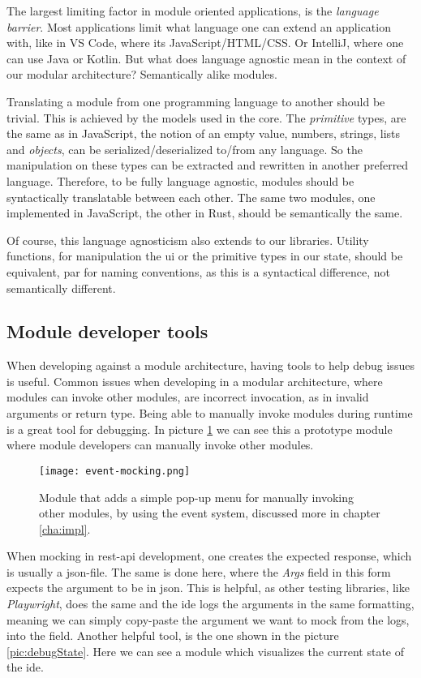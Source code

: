 The largest limiting factor in module oriented applications, is the
\textit{language barrier}. Most applications limit what language one can extend
an application with, like in VS Code, where its JavaScript/HTML/CSS. Or
IntelliJ, where one can use Java or Kotlin. But what does language agnostic
mean in the context of our modular architecture? Semantically alike modules.

Translating a module from one programming language to another should be trivial.
This is achieved by the models used in the core. The \textit{primitive} types,
are the same as in JavaScript, the notion of an empty value, numbers, strings,
lists and \textit{objects}, can be serialized/deserialized to/from any language.
So the manipulation on these types can be extracted and rewritten in another
preferred language. Therefore, to be fully language agnostic, modules should be
syntactically translatable between each other. The same two modules, one
implemented in JavaScript, the other in Rust, should be semantically the same.

Of course, this language agnosticism also extends to our libraries. Utility
functions, for manipulation the \gls*{ui} or the primitive types in our state,
should be equivalent, par for naming conventions, as this is a syntactical
difference, not semantically different.


\subsection{Module developer tools}

When developing against a module architecture, having tools to help debug issues
is useful. Common issues when developing in a modular architecture, where
modules can invoke other modules, are incorrect invocation, as in invalid
arguments or return type. Being able to manually invoke modules during runtime
is a great tool for debugging. In picture \ref{pic:eventMock} we can see this a
prototype module where module developers can manually invoke other modules.

\begin{figure}[H]
  \centering
  \texttt{[image: event-mocking.png]}
  \caption{
    Module that adds a simple pop-up menu for manually invoking other modules,
    by using the event system, discussed more in chapter \ref{cha:impl}.
  }
  \label{pic:eventMock}
\end{figure}

When mocking in \gls*{rest}-\gls*{api} development, one creates the expected
response, which is usually a \gls*{json}-file. The same is done here, where the
\textit{Args} field in this form expects the argument to be in \gls*{json}. This
is helpful, as other testing libraries, like \textit{Playwright}, does the same
and the \gls*{ide} logs the arguments in the same formatting, meaning we
can simply copy-paste the argument we want to mock from the logs, into the
field. Another helpful tool, is the one shown in the picture
\ref{pic:debugState}. Here we can see a module which visualizes the current
state of the \gls*{ide}.


